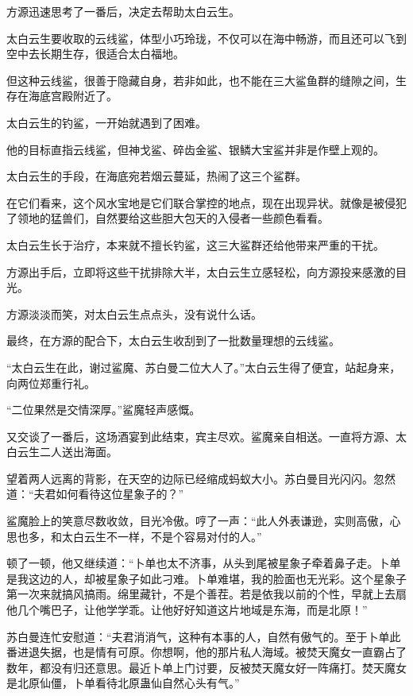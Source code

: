 
\begin{this_body}

方源迅速思考了一番后，决定去帮助太白云生。

太白云生要收取的云线鲨，体型小巧玲珑，不仅可以在海中畅游，而且还可以飞到空中去长期生存，很适合太白福地。

但这种云线鲨，很善于隐藏自身，若非如此，也不能在三大鲨鱼群的缝隙之间，生存在海底宫殿附近了。

太白云生的钓鲨，一开始就遇到了困难。

他的目标直指云线鲨，但神戈鲨、碎齿金鲨、银鳞大宝鲨并非是作壁上观的。

太白云生的手段，在海底宛若烟云蔓延，热闹了这三个鲨群。

在它们看来，这个风水宝地是它们联合掌控的地点，现在出现异状。就像是被侵犯了领地的猛兽们，自然要给这些胆大包天的入侵者一些颜色看看。

太白云生长于治疗，本来就不擅长钓鲨，这三大鲨群还给他带来严重的干扰。

方源出手后，立即将这些干扰排除大半，太白云生立感轻松，向方源投来感激的目光。

方源淡淡而笑，对太白云生点点头，没有说什么话。

最终，在方源的配合下，太白云生收刮到了一批数量理想的云线鲨。

“太白云生在此，谢过鲨魔、苏白曼二位大人了。”太白云生得了便宜，站起身来，向两位郑重行礼。

“二位果然是交情深厚。”鲨魔轻声感慨。

又交谈了一番后，这场酒宴到此结束，宾主尽欢。鲨魔亲自相送。一直将方源、太白云生二人送出海面。

望着两人远离的背影，在天空的边际已经缩成蚂蚁大小。苏白曼目光闪闪。忽然道：“夫君如何看待这位星象子的？”

鲨魔脸上的笑意尽数收敛，目光冷傲。哼了一声：“此人外表谦逊，实则高傲，心思也多，和太白云生不一样，不是个容易对付的人。”

顿了一顿，他又继续道：“卜单也太不济事，从头到尾被星象子牵着鼻子走。卜单是我这边的人，却被星象子如此刁难。卜单难堪，我的脸面也无光彩。这个星象子第一次来就搞风搞雨。绵里藏针，不是个善茬。若是依我以前的个性，早就上去扇他几个嘴巴子，让他学学乖。让他好好知道这片地域是东海，而是北原！”

苏白曼连忙安慰道：“夫君消消气，这种有本事的人，自然有傲气的。至于卜单此番进退失据，也是情有可原。你想啊，他的那片私人海域。被焚天魔女一直霸占了数年，都没有归还意思。最近卜单上门讨要，反被焚天魔女好一阵痛打。焚天魔女是北原仙僵，卜单看待北原蛊仙自然心头有气。”


\end{this_body}
